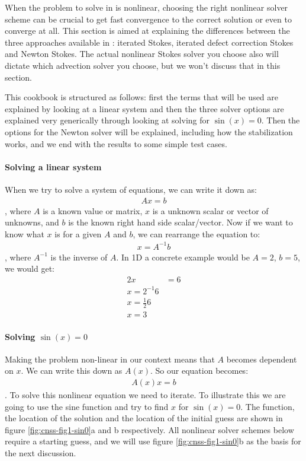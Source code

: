 When the problem to solve in \aspect{} is nonlinear, choosing the right nonlinear 
solver scheme can be crucial to get fast convergence to the correct solution or  
even to converge at all. This section is aimed at explaining the differences between 
the three approaches available in \aspect{}: iterated Stokes, iterated defect correction
Stokes and Newton Stokes. The actual nonlinear Stokes solver you choose also will dictate 
which advection solver you choose, but we won't discuss that in this section.

This cookbook is structured as follows: first the terms that will be used are explained  by looking 
at a linear system and then the three solver options are explained very 
generically through looking at solving for $\sin(x)=0$. Then the options for the Newton
solver will be explained, including how the stabilization works, and we end with 
the results to some simple test cases.

\paragraph{Solving a linear system}

When we try to solve a system of equations, we can write it down as:
\begin{align}
    \label{sec:cnss:eq1:axb}
    A x = b
\end{align}, where $A$ is a known value or matrix, $x$ is a unknown scalar or vector of
 unknowns, and $b$ is the known right hand side scalar/vector. Now if we want to know what $x$ is 
 for a given $A$ and $b$, we can rearrange the equation to:
\begin{align}
    x = A^{-1} b
\end{align}, where $A^{-1}$ is the inverse of $A$. In 1D a concrete example would be $A=2$,
$b=5$, we would get:
\begin{align}
    2 x &= 6 \\
    x = 2^{-1} 6 \\
    x = \frac{1}{2} 6 \\
    x = 3
\end{align}

\paragraph{Solving $\sin(x)=0$}

Making the problem non-linear in our context means that $A$ becomes dependent on $x$. We 
can write this down as $A(x)$. So our equation becomes:
\begin{align}
    \label{sec:cnss:eq1:axxb}
    A(x) x = b
\end{align}. To solve this nonlinear equation we need to iterate. To illustrate this we are
going to use the sine function and try to find $x$ for $\sin(x)=0$. The function, the location of
the solution and the location of the initial guess are shown in figure \ref{fig:cnss-fig1-sin0}a 
and b respectively. All nonlinear solver schemes below require a starting guess, and we will use 
figure \ref{fig:cnss-fig1-sin0}b as the basis for the next discussion.

